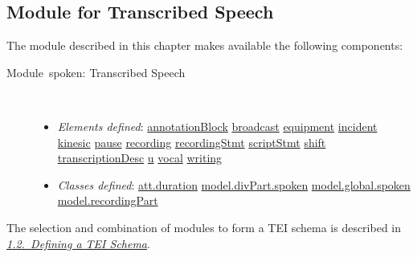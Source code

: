 \subsection[{Module for Transcribed Speech}]{Module for Transcribed Speech}\par
The module described in this chapter makes available the following components: \begin{description}

\item[{Module spoken: Transcribed Speech}]\hspace{1em}\hfill\linebreak
\mbox{}\\[-10pt] \begin{itemize}
\item {\itshape Elements defined}: \hyperref[TEI.annotationBlock]{annotationBlock} \hyperref[TEI.broadcast]{broadcast} \hyperref[TEI.equipment]{equipment} \hyperref[TEI.incident]{incident} \hyperref[TEI.kinesic]{kinesic} \hyperref[TEI.pause]{pause} \hyperref[TEI.recording]{recording} \hyperref[TEI.recordingStmt]{recordingStmt} \hyperref[TEI.scriptStmt]{scriptStmt} \hyperref[TEI.shift]{shift} \hyperref[TEI.transcriptionDesc]{transcriptionDesc} \hyperref[TEI.u]{u} \hyperref[TEI.vocal]{vocal} \hyperref[TEI.writing]{writing}
\item {\itshape Classes defined}: \hyperref[TEI.att.duration]{att.duration} \hyperref[TEI.model.divPart.spoken]{model.divPart.spoken} \hyperref[TEI.model.global.spoken]{model.global.spoken} \hyperref[TEI.model.recordingPart]{model.recordingPart}
\end{itemize} 
\end{description}  The selection and combination of modules to form a TEI schema is described in \textit{\hyperref[STIN]{1.2.\ Defining a TEI Schema}}.